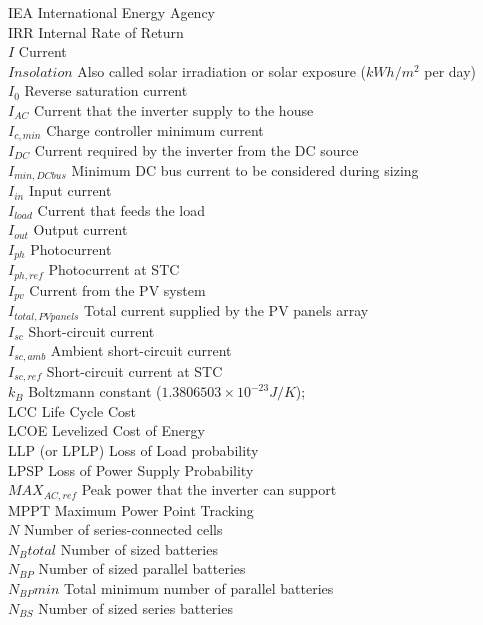 IEA International Energy Agency \\
IRR  Internal Rate of Return \\
$I$ Current \\
$Insolation$ Also called solar irradiation or solar exposure ($kWh/m^{2}$ per day) \\
$I_{0}$ Reverse saturation current \\
$ I_{AC} $ Current that the inverter supply to the house \\
$I_{c,min}$ Charge controller minimum current \\
$ I_{DC} $ Current required by the inverter from the DC source \\
$I_{min,DCbus}$ Minimum DC bus current to be considered during sizing \\
$ I_{in} $ Input current \\
$I_{load}$ Current that feeds the load \\
$ I_{out} $ Output current \\
$I_{ph}$ Photocurrent \\
$ I_{ph,ref} $ Photocurrent at STC \\
$I_{pv}$ Current from the PV system \\
$I_{total,PVpanels}$ Total current supplied by the PV panels array \\
$ I_{sc} $ Short-circuit current \\
$ I_{sc,amb} $ Ambient short-circuit current \\
$ I_{sc,ref} $ Short-circuit current at STC \\
$ k_{B} $ Boltzmann constant ($ 1.3806503\times10^{-23}J/K $); \\
LCC  Life Cycle Cost \\
LCOE Levelized Cost of Energy \\
LLP  (or LPLP) Loss of Load probability \\
LPSP Loss of Power Supply Probability \\
$MAX_{AC,ref}$ Peak power that the inverter can support \\
MPPT Maximum Power Point Tracking \\
$N$ Number of series-connected cells \\
$N_{B}total$ Number of sized batteries \\
$N_{BP}$ Number of sized parallel batteries \\
$N_{BP}min$ Total minimum number of parallel batteries \\
$N_{BS}$ Number of sized series batteries \\
